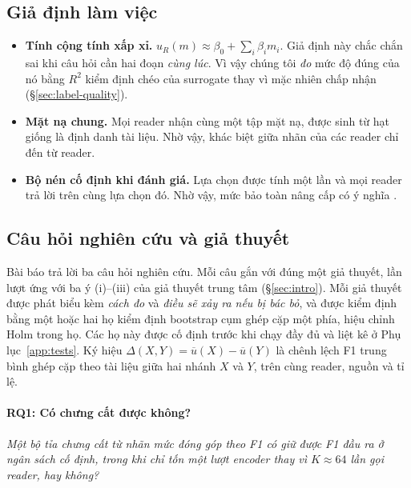 \documentclass[11pt]{article}
\begin{document}
\subsection{Giả định làm việc}
\label{sec:assumptions}

\begin{itemize}
  \item[\textbf{A1}] \textbf{Tính cộng tính xấp xỉ.} $u_R(m)\approx\beta_0+\sum_i\beta_i m_i$.
  Giả định này chắc chắn sai khi câu hỏi cần hai đoạn \emph{cùng lúc}. Vì vậy chúng
  tôi \emph{đo} mức độ đúng của nó bằng $R^2$ kiểm định chéo của surrogate thay vì
  mặc nhiên chấp nhận (\S\ref{sec:label-quality}).
  \item[\textbf{A2}] \textbf{Mặt nạ chung.} Mọi reader nhận cùng một tập mặt nạ,
  được sinh từ hạt giống là định danh tài liệu. Nhờ vậy, khác biệt giữa nhãn của
  các reader chỉ đến từ reader.
  \item[\textbf{A3}] \textbf{Bộ nén cố định khi đánh giá.} Lựa chọn được tính một
  lần và mọi reader trả lời trên cùng lựa chọn đó. Nhờ vậy, mức bảo toàn nâng
  cấp có ý nghĩa \citep{readerScaling2026}.
\end{itemize}

\subsection{Câu hỏi nghiên cứu và giả thuyết}

Bài báo trả lời ba câu hỏi nghiên cứu. Mỗi câu gắn với đúng một giả thuyết, lần lượt ứng với ba ý
(i)--(iii) của giả thuyết trung tâm (\S\ref{sec:intro}). Mỗi giả thuyết được phát biểu kèm \emph{cách
đo} và \emph{điều sẽ xảy ra nếu bị bác bỏ}, và được kiểm định bằng một hoặc hai họ kiểm định bootstrap
cụm ghép cặp một phía, hiệu chỉnh Holm trong họ. Các họ này được cố định trước khi chạy đầy đủ và liệt
kê ở Phụ lục~\ref{app:tests}. Ký hiệu $\Delta(X,Y)=\overline{u}(X)-\overline{u}(Y)$ là chênh lệch F1
trung bình ghép cặp theo tài liệu giữa hai nhánh $X$ và $Y$, trên cùng reader, nguồn và tỉ lệ.

\paragraph{RQ1: Có chưng cất được không?}
\emph{Một bộ tỉa chưng cất từ nhãn mức đóng góp theo F1 có giữ được F1 đầu ra ở ngân sách cố định,
trong khi chỉ tốn một lượt encoder thay vì $K{\approx}64$ lần gọi reader, hay không?}
\end{document}
